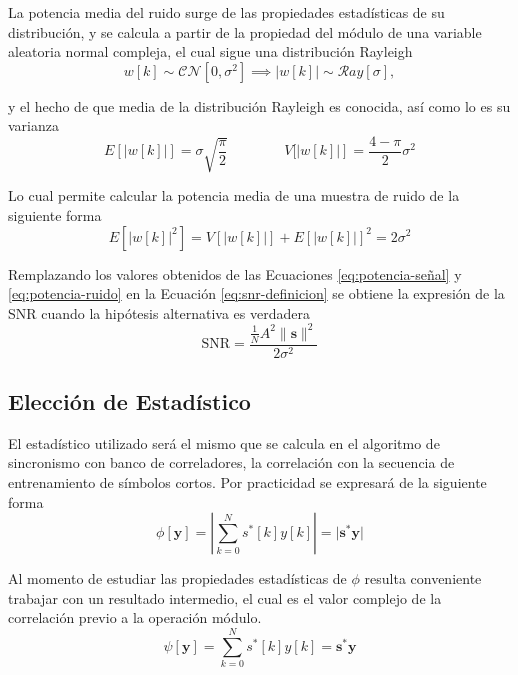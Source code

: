 La potencia media del ruido surge de las propiedades estadísticas de su distribución, y se calcula a partir de la propiedad del módulo de una variable aleatoria normal compleja, el cual sigue una distribución Rayleigh
\begin{equation}
w[k] \sim \mathcal{CN}\left[0, \sigma^2\right]  \implies|w[k]| \sim \mathcal{R}ay\left[\sigma\right],
\end{equation}

y el hecho de que media de la distribución Rayleigh es conocida, así como lo es su varianza
\begin{equation}
E\left[\lvert w[k]\rvert\right] = \sigma \sqrt{\frac{\pi}{2}}\qquad\qquad V[\left\lvert w[k] \rvert\right] = \frac{4-\pi}{2} \sigma^2
\end{equation}

Lo cual permite calcular la potencia media de una muestra de ruido de la siguiente forma
\begin{equation}\label{eq:potencia-ruido}
E\left[\lvert w[k]\rvert^2\right] = V\left[\lvert w[k]\rvert\right] + E\left[\lvert w[k]\rvert\right]^2 =  2\sigma^2
\end{equation}

Remplazando los valores obtenidos de las Ecuaciones \ref{eq:potencia-señal} y \ref{eq:potencia-ruido} en la Ecuación \ref{eq:snr-definicion} se obtiene la expresión de la SNR cuando la hipótesis alternativa es verdadera
\begin{equation}
\text{SNR} = \frac{\frac{1}{N} A^2 \lVert \mathbf{s} \rVert ^2}{2 \sigma^2}
\end{equation}

\subsection{Elección de Estadístico}
\label{Ss:hipotesis-estadistico}


El estadístico utilizado será el mismo que se calcula en el algoritmo de sincronismo con banco de correladores, la correlación con la secuencia de entrenamiento de símbolos cortos. Por practicidad se expresará de la siguiente forma
\begin{equation}
    \phi[\mathbf{y}] = \left\lvert\sum_{k=0}^N s^\ast[k]y[k]\right\rvert = \lvert \mathbf{s}^\ast\mathbf{y}\rvert
\end{equation}

Al momento de estudiar las propiedades estadísticas de $\phi$ resulta conveniente trabajar con un resultado intermedio, el cual es el valor complejo de la correlación previo a la operación módulo.
\begin{equation}
    \psi[\mathbf{y}] = \sum_{k=0}^N s^\ast[k]y[k] = \mathbf{s}^\ast\mathbf{y}
\end{equation}

